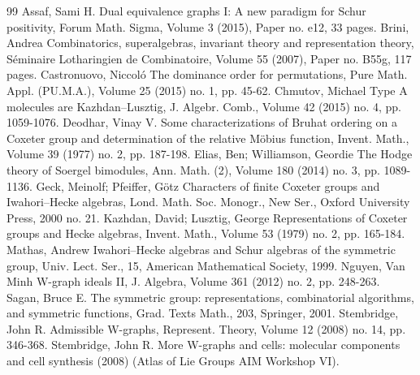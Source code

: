 \begin{thebibliography}{99}
 Assaf, Sami H. Dual equivalence graphs I: A new paradigm for Schur positivity, Forum Math. Sigma, Volume 3 (2015), Paper no. e12, 33 pages.
 Brini, Andrea Combinatorics, superalgebras, invariant theory and representation theory, Séminaire Lotharingien de Combinatoire, Volume 55 (2007), Paper no. B55g, 117 pages.
 Castronuovo, Niccoló The dominance order for permutations, Pure Math. Appl. (PU.M.A.), Volume 25 (2015) no. 1, pp. 45-62.
 Chmutov, Michael Type A molecules are Kazhdan–Lusztig, J. Algebr. Comb., Volume 42 (2015) no. 4, pp. 1059-1076.
 Deodhar, Vinay V. Some characterizations of Bruhat ordering on a Coxeter group and determination of the relative Möbius function, Invent. Math., Volume 39 (1977) no. 2, pp. 187-198.
 Elias, Ben; Williamson, Geordie The Hodge theory of Soergel bimodules, Ann. Math. (2), Volume 180 (2014) no. 3, pp. 1089-1136.
 Geck, Meinolf; Pfeiffer, Götz Characters of finite Coxeter groups and Iwahori–Hecke algebras, Lond. Math. Soc. Monogr., New Ser., Oxford University Press, 2000 no. 21.
 Kazhdan, David; Lusztig, George Representations of Coxeter groups and Hecke algebras, Invent. Math., Volume 53 (1979) no. 2, pp. 165-184.
 Mathas, Andrew Iwahori–Hecke algebras and Schur algebras of the symmetric group, Univ. Lect. Ser., 15, American Mathematical Society, 1999.
 Nguyen, Van Minh W-graph ideals II, J. Algebra, Volume 361 (2012) no. 2, pp. 248-263.
 Sagan, Bruce E. The symmetric group: representations, combinatorial algorithms, and symmetric functions, Grad. Texts Math., 203, Springer, 2001.
 Stembridge, John R. Admissible W-graphs, Represent. Theory, Volume 12 (2008) no. 14, pp. 346-368.
 Stembridge, John R. More W-graphs and cells: molecular components and cell synthesis (2008) (Atlas of Lie Groups AIM Workshop VI).
\end{thebibliography}
